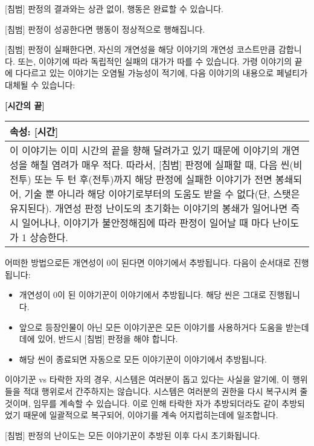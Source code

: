 \documentclass[12pt]{report}
\newenvironment{story}[2]
{\begin{center}
		{\large \textbf{[#1]}}\\[1ex]
		\begin{tabular}{|p{\textwidth}|}
			\hline
			\textbf{속성}: #2
			\\
			\hline
		}
		{ 
			\\\hline
		\end{tabular}
	\end{center}
}
\begin{document}
	[침범] 판정의 결과와는 상관 없이, 행동은 완료할 수 있습니다.
	
	[침범] 판정이 성공한다면 행동이 정상적으로 행해집니다.
	
	[침범] 판정이 실패한다면, 자신의 개연성을 해당 이야기의 개연성 코스트만큼 감합니다. 또는, 이야기에 따라 독립적인 실패의 대가가 따를 수 있습니다. 가령 이야기의 끝에 다다르고 있는 이야기는 오염될 가능성이 적기에, 다음 이야기의 내용으로 페널티가 대체될 수 있습니다:
	\begin{story}{시간의 끝}{[시간]}
		이 이야기는 이미 시간의 끝을 향해 달려가고 있기 때문에 이야기의 개연성을 해칠 염려가 매우 적다. 따라서, [침범] 판정에 실패할 때, 다음 씬(비전투) 또는 두 턴 후(전투)까지 해당 판정에 실패한 이야기가 전면 봉쇄되어, 기술 뿐 아니라 해당 이야기로부터의 도움도 받을 수 없다(단, 스탯은 유지된다). 개연성 판정 난이도의 초기화는 이야기의 봉쇄가 일어나면 즉시 일어나나, 이야기가 불안정해짐에 따라 판정이 일어날 때 마다 난이도가 1 상승한다.
	\end{story}
	
	어떠한 방법으로든 개연성이 0이 된다면 이야기에서 추방됩니다. 다음이 순서대로 진행됩니다:
	\begin{itemize}
		\item 개연성이 0이 된 이야기꾼이 이야기에서 추방됩니다. 해당 씬은 그대로 진행됩니다.
		\item 앞으로 등장인물이 아닌 모든 이야기꾼은 모든 이야기를 사용하거다 도움을 받는데데에 있어, 반드시 [침범] 판정을 해야 합니다.
		\item 해당 씬이 종료되면 자동으로 모든 이야기꾼이 이야기에서 추방됩니다.
	\end{itemize}
	이야기꾼 vs 타락한 자의 경우, 시스템은 여러분이 돕고 있다는 사실을 알기에, 이 행위들을 적대 행위로서 간주하지는 않습니다. 시스템은 여러분의 권한을 다시 복구시켜 줄 것이며, 임무를 계속할 수 있습니다. 이로 인해 타락한 자가 추방되더라도 같이 추방되었기 때문에 일괄적으로 복구되어, 이야기를 계속 어지럽히는데에 일조합니다.
	
	[침범] 판정의 난이도는 모든 이야기꾼이 추방된 이후 다시 초기화됩니다.
	
\end{document}
